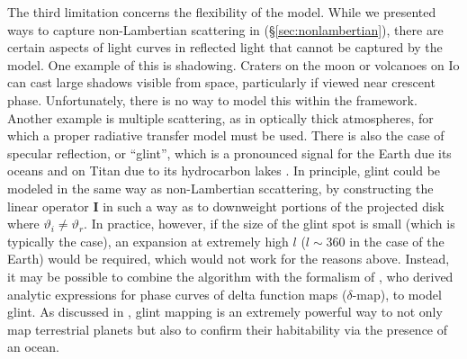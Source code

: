 \documentclass[modern]{aastex62}
\begin{document}
The third limitation concerns the flexibility of the \starry model.
While we presented ways to capture non-Lambertian scattering
in \starry (\S\ref{sec:nonlambertian}), there are certain aspects
of light curves in reflected light that cannot be captured by the model.
One example of this is shadowing. Craters on the moon or
volcanoes on Io can cast large shadows visible from space, particularly
if viewed near crescent phase. Unfortunately, there is no way to model
this within the \starry framework. Another example is multiple scattering,
as in optically thick atmospheres, for which a proper radiative transfer model
must be used. There is also the case of specular reflection,
or ``glint'', which is a pronounced signal for the Earth due its
oceans \citep{Robinson2014} and on Titan due to
its hydrocarbon lakes \citep{Barnes2011}. In principle, glint could be
modeled in the same way as non-Lambertian sccattering, by constructing the
linear operator $\mathbf{I}$ in such a way as to downweight portions of the
projected disk where $\vartheta_i \neq \vartheta_r$. In practice, however,
if the size of the glint spot is small (which is typically the case),
an expansion at extremely high $l$ ($l \sim 360$ in the case of the Earth)
would be required, which would not work for the reasons above.
Instead, it may be possible to combine the \starry algorithm with the
formalism of \citet{Haggard2018}, who derived analytic expressions for
phase curves of delta function maps ($\delta$-map), to model glint.
As discussed in \citet{LustigYaeger2018}, glint mapping is an extremely
powerful way to not only map terrestrial planets but also to confirm
their habitability via the presence of an ocean.
\end{document}
